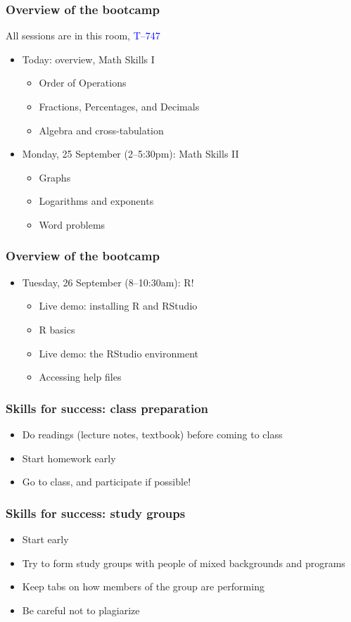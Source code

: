 \documentclass[12pt]{beamer}
\newcommand{\myframe}[1]{\begin{frame} \frametitle{#1}}
\newenvironment{spaceitemize}
{ \begin{itemize}
    \setlength{\itemsep}{10pt}
    \setlength{\parskip}{0pt}
    \setlength{\parsep}{0pt}     }
{ \end{itemize}                  }
\begin{document}
\myframe{Overview of the bootcamp}
All sessions are in this room, \textcolor{blue}{T--747}
\begin{spaceitemize}
\item Today: overview, Math Skills I
\begin{spaceitemize}
\item Order of Operations
\item Fractions, Percentages, and Decimals
\item Algebra and cross-tabulation
\end{spaceitemize}
\item Monday, 25 September (2--5:30pm): Math Skills II
\begin{spaceitemize}
\item Graphs
\item Logarithms and exponents
\item Word problems
\end{spaceitemize}
\end{spaceitemize}
\end{frame}

\myframe{Overview of the bootcamp}
\begin{spaceitemize}
\item Tuesday, 26 September (8--10:30am): R! 
\begin{spaceitemize}
\item Live demo: installing R and RStudio
\item R basics
\item Live demo: the RStudio environment
\item Accessing help files
\end{spaceitemize}
\end{spaceitemize}
\end{frame}

\myframe{Skills for success: class preparation}
\begin{spaceitemize}
\item Do readings (lecture notes, textbook) before coming to class
\item Start homework early
\item Go to class, and participate if possible!
\end{spaceitemize}
\end{frame}

\myframe{Skills for success: study groups}
\begin{spaceitemize}
\item Start early
\item Try to form study groups with people of mixed backgrounds and programs
\item Keep tabs on how members of the group are performing
\item Be careful not to plagiarize
\end{spaceitemize}
\end{frame}
\end{document}
